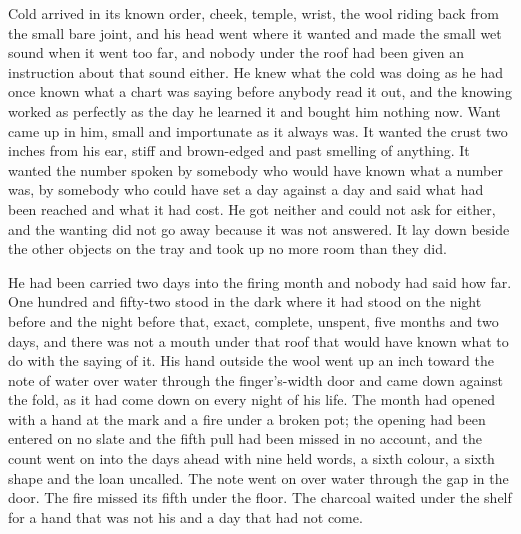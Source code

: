 Cold arrived in its known order, cheek, temple, wrist, the wool riding back from the small bare joint, and his head went where it wanted and made the small wet sound when it went too far, and nobody under the roof had been given an instruction about that sound either. He knew what the cold was doing as he had once known what a chart was saying before anybody read it out, and the knowing worked as perfectly as the day he learned it and bought him nothing now. Want came up in him, small and importunate as it always was. It wanted the crust two inches from his ear, stiff and brown-edged and past smelling of anything. It wanted the number spoken by somebody who would have known what a number was, by somebody who could have set a day against a day and said what had been reached and what it had cost. He got neither and could not ask for either, and the wanting did not go away because it was not answered. It lay down beside the other objects on the tray and took up no more room than they did.

He had been carried two days into the firing month and nobody had said how far. One hundred and fifty-two stood in the dark where it had stood on the night before and the night before that, exact, complete, unspent, five months and two days, and there was not a mouth under that roof that would have known what to do with the saying of it. His hand outside the wool went up an inch toward the note of water over water through the finger's-width door and came down against the fold, as it had come down on every night of his life. The month had opened with a hand at the mark and a fire under a broken pot; the opening had been entered on no slate and the fifth pull had been missed in no account, and the count went on into the days ahead with nine held words, a sixth colour, a sixth shape and the loan uncalled. The note went on over water through the gap in the door. The fire missed its fifth under the floor. The charcoal waited under the shelf for a hand that was not his and a day that had not come.
